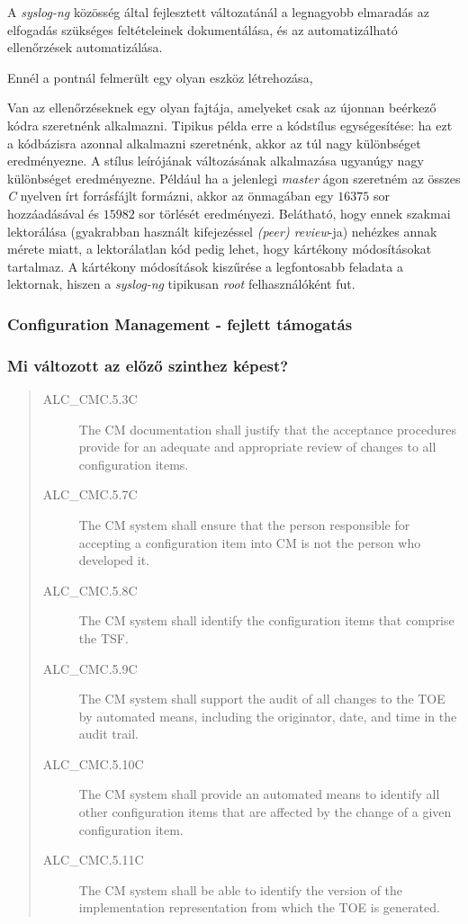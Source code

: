 A \emph{syslog-ng} közösség által fejlesztett változatánál a legnagyobb elmaradás az elfogadás
szükséges feltételeinek dokumentálása, és az automatizálható ellenőrzések automatizálása.

Ennél a pontnál felmerült egy olyan eszköz létrehozása, 

Van az ellenőrzéseknek egy olyan fajtája, amelyeket csak az újonnan beérkező kódra szeretnénk
alkalmazni. Tipikus példa erre a kódstílus egységesítése: ha ezt a kódbázisra azonnal alkalmazni
szeretnénk, akkor az túl nagy különbséget eredményezne. A stílus leírójának változásának alkalmazása
ugyanúgy nagy különbséget eredményezne. Például ha a jelenlegi \emph{master} ágon szeretném az
összes \emph{C} nyelven írt forrásfájlt formázni, akkor az önmagában egy $16375$ sor hozzáadásával
és $15982$ sor törlését eredményezi.
Belátható, hogy ennek szakmai lektorálása (gyakrabban használt kifejezéssel \emph{(peer) review}-ja)
nehézkes annak mérete miatt, a lektorálatlan kód pedig lehet, hogy kártékony módosításokat tartalmaz.
A kártékony módosítások kiszűrése a legfontosabb feladata a lektornak, hiszen a \emph{syslog-ng}
tipikusan \emph{root} felhasználóként fut.


\subsubsection{Configuration Management - fejlett támogatás}
\subsubsection{Mi változott az előző szinthez képest?}
\begin{quote}
    \begin{description}
        \item[ALC\_CMC.5.3C]{The CM documentation shall justify that the acceptance procedures
            provide for an adequate and appropriate review of changes to all configuration items.}
        \item[ALC\_CMC.5.7C]{The CM system shall ensure that the person responsible for accepting a
            configuration item into CM is not the person who developed it.}
        \item[ALC\_CMC.5.8C]{The CM system shall identify the configuration items that comprise the
            TSF.}
        \item[ALC\_CMC.5.9C]{The CM system shall support the audit of all changes to the TOE by
            automated means, including the originator, date, and time in the audit trail.}
        \item[ALC\_CMC.5.10C]{The CM system shall provide an automated means to identify all other
            configuration items that are affected by the change of a given configuration item.}
        \item[ALC\_CMC.5.11C]{The CM system shall be able to identify the version of the
            implementation representation from which the TOE is generated.}
    \end{description}
\end{quote}

